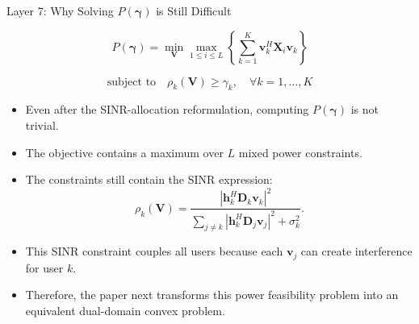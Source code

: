 \documentclass{beamer}
\begin{document}
\begin{frame}{Layer 7: Why Solving \(P(\boldsymbol{\gamma})\) is Still Difficult}
\scriptsize

\[
P(\boldsymbol{\gamma})
=
\min_{\mathbf{V}}
\max_{1\le i\le L}
\left\{
\sum_{k=1}^{K}
\mathbf{v}_k^H\mathbf{X}_i\mathbf{v}_k
\right\}
\]

\[
\text{subject to}
\quad
\rho_k(\mathbf{V})\ge\gamma_k,
\quad \forall k=1,\ldots,K
\]

\begin{itemize}
    \item Even after the SINR-allocation reformulation, computing \(P(\boldsymbol{\gamma})\) is not trivial.

    \item The objective contains a maximum over \(L\) mixed power constraints.

    \item The constraints still contain the SINR expression:
    \[
        \rho_k(\mathbf{V})
        =
        \frac{
        |\mathbf{h}_k^H\mathbf{D}_k\mathbf{v}_k|^2
        }{
        \sum_{j\ne k}
        |\mathbf{h}_k^H\mathbf{D}_j\mathbf{v}_j|^2+\sigma_k^2
        }.
    \]

    \item This SINR constraint couples all users because each \(\mathbf{v}_j\) can create interference for user \(k\).

    \item Therefore, the paper next transforms this power feasibility problem into an equivalent dual-domain convex problem.
\end{itemize}

\end{frame}
\end{document}
